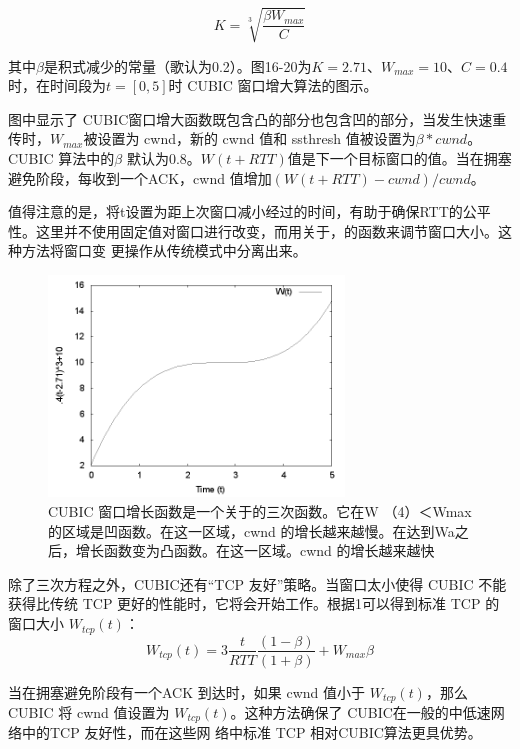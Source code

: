 \begin{equation}
    K = \sqrt[3]{\frac{\beta W_{max}}{C}}
\end{equation}

其中$\beta$是积式减少的常量（歌认为0.2）。图16-20为$K=2.71$、$W_{max} =10$、$C=0.4$时，在时间段为$t=[0,5]$时 CUBIC 窗口增大算法的图示。

图中显示了 CUBIC窗口增大函数既包含凸的部分也包含凹的部分，当发生快速重传时，$W_{max}$被设置为 cwnd，新的 cwnd 值和 ssthresh 值被设置为$\beta * cwnd$。 CUBIC 算法中的$\beta$
默认为0.8。$W(t+RTT)$值是下一个目标窗口的值。当在拥塞避免阶段，每收到一个ACK，cwnd 值增加$(W(t+ RTT) - cwnd)/cwnd$。

值得注意的是，将t设置为距上次窗口减小经过的时间，有助于确保RTT的公平性。这里并不使用固定值对窗口进行改变，而用关于，的函数来调节窗口大小。这种方法将窗口变
更操作从传统模式中分离出来。

\begin{figure}[!htb]
    \centering
	\includegraphics[width=0.7\textwidth]{imgs/16/16-20.png}
	\caption{CUBIC 窗口增长函数是一个关于的三次函数。它在W （4）＜Wmax 的区域是凹函数。在这一区域，cwnd 的增长越来越慢。在达到Wa之后，增长函数变为凸函数。在这一区域。cwnd
        的增长越来越快}
\end{figure}

除了三次方程之外，CUBIC还有“TCP 友好”策略。当窗口太小使得 CUBIC 不能获得比传统 TCP 更好的性能时，它将会开始工作。根据1可以得到标准 TCP 的窗口大小 $W_{tcp}(t)$：
\begin{equation}
    W_{tcp}(t) = 3 \frac{t}{RTT} \frac{(1-\beta)}{(1+\beta)} + W_{max} \beta
\end{equation}

当在拥塞避免阶段有一个ACK 到达时，如果 cwnd 值小于 $W_{tcp}(t)$，那么 CUBIC 将 cwnd 值设置为 $W_{tcp}(t)$。这种方法确保了 CUBIC在一般的中低速网络中的TCP 友好性，而在这些网
络中标准 TCP 相对CUBIC算法更具优势。

